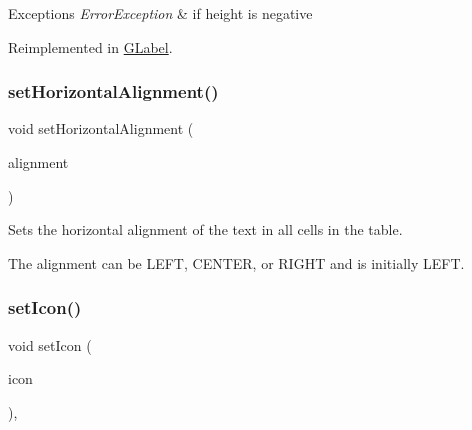 \begin{DoxyExceptions}{Exceptions}
{\em Error\+Exception} & if height is negative \\
\hline
\end{DoxyExceptions}


Reimplemented in \mbox{\hyperlink{classsgl_1_1GLabel_a5eead864d1249c4406f32f9944ed1503}{G\+Label}}.

\mbox{\label{classsgl_1_1GTable_a04e6ce745dd0f9708f14dedc68ec8b18}} 
\subsubsection{\texorpdfstring{set\+Horizontal\+Alignment()}{setHorizontalAlignment()}}
{\footnotesize\ttfamily void set\+Horizontal\+Alignment (\begin{DoxyParamCaption}\item[{\mbox{\hyperlink{namespacesgl_aa00e70829e72ff16addc4d9f06fe3bc5}{Horizontal\+Alignment}}}]{alignment }\end{DoxyParamCaption})\hspace{0.3cm}{\ttfamily [virtual]}}



Sets the horizontal alignment of the text in all cells in the table. 

The alignment can be L\+E\+FT, C\+E\+N\+T\+ER, or R\+I\+G\+HT and is initially L\+E\+FT. \mbox{\label{classsgl_1_1GInteractor_a542abfcd7261751352af129c7215ecda}} 
\subsubsection{\texorpdfstring{set\+Icon()}{setIcon()}\hspace{0.1cm}{\footnotesize\ttfamily [1/3]}}
{\footnotesize\ttfamily void set\+Icon (\begin{DoxyParamCaption}\item[{const Q\+Icon \&}]{icon }\end{DoxyParamCaption})\hspace{0.3cm}{\ttfamily [virtual]}, {\ttfamily [inherited]}}



